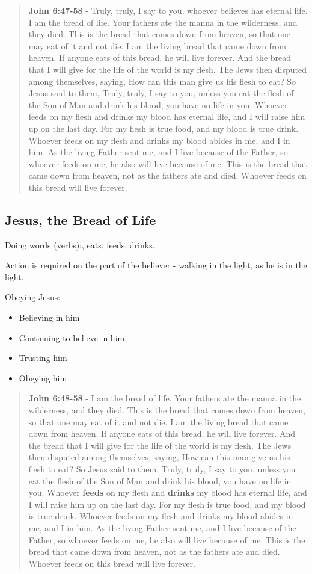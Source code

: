 \documentclass[11pt]{article}
\begin{document}
\begin{quote}
\textbf{John 6:47-58} - Truly, truly, I say to you, whoever believes has eternal life. I am the bread of life. Your fathers ate the manna in the wilderness, and they died. This is the bread that comes down from heaven, so that one may eat of it and not die. I am the living bread that came down from heaven. If anyone eats of this bread, he will live forever. And the bread that I will give for the life of the world is my flesh. The Jews then disputed among themselves, saying, How can this man give us his flesh to eat? So Jesus said to them, Truly, truly, I say to you, unless you eat the flesh of the Son of Man and drink his blood, you have no life in you. Whoever feeds on my flesh and drinks my blood has eternal life, and I will raise him up on the last day. For my flesh is true food, and my blood is true drink. Whoever feeds on my flesh and drinks my blood abides in me, and I in him. As the living Father sent me, and I live because of the Father, so whoever feeds on me, he also will live because of me. This is the bread that came down from heaven, not as the fathers ate and died. Whoever feeds on this bread will live forever.
\end{quote}

\subsection{Jesus, the Bread of Life}
\label{sec:org74e9be4}
Doing words (verbs):, eats, feeds, drinks.

Action is required on the part of the believer - walking in the light, as he is in the light.

Obeying Jesus:
\begin{itemize}
\item Believing in him
\item Continuing to believe in him
\item Trusting him
\item Obeying him
\end{itemize}

\begin{quote}
\textbf{John 6:48-58} - I am the bread of life. Your fathers ate the manna in the wilderness, and they died. This is the bread that comes down from heaven, so that one may eat of it and not die. I am the living bread that came down from heaven. If anyone eats of this bread, he will live forever. And the bread that I will give for the life of the world is my flesh. The Jews then disputed among themselves, saying, How can this man give us his flesh to eat? So Jesus said to them, Truly, truly, I say to you, unless you eat the flesh of the Son of Man and drink his blood, you have no life in you. Whoever \textbf{feeds} on my flesh and \textbf{drinks} my blood has eternal life, and I will raise him up on the last day. For my flesh is true food, and my blood is true drink. Whoever feeds on my flesh and drinks my blood abides in me, and I in him. As the living Father sent me, and I live because of the Father, so whoever feeds on me, he also will live because of me. This is the bread that came down from heaven, not as the fathers ate and died. Whoever feeds on this bread will live forever.
\end{quote}
\end{document}
